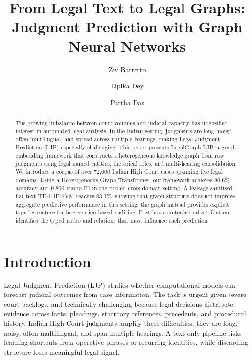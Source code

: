 \documentclass[runningheads]{llncs}
\newcommand{\method}{LegalGraph-LJP}
\begin{document}
\title{From Legal Text to Legal Graphs: Judgment Prediction with Graph Neural Networks}

\author{Ziv Barretto\and Lipika Dey\and Partha Das}


\maketitle

\begin{abstract}
The growing imbalance between court volumes and judicial capacity has intensified interest in automated legal analysis. In the Indian setting, judgments are long, noisy, often multilingual, and spread across multiple hearings, making Legal Judgment Prediction (LJP) especially challenging. This paper presents \method{}, a graph-embedding framework that constructs a heterogeneous knowledge graph from raw judgments using legal named entities, rhetorical roles, and multi-hearing consolidation. We introduce a corpus of over 72,000 Indian High Court cases spanning five legal domains. Using a Heterogeneous Graph Transformer, our framework achieves 80.6\% accuracy and 0.800 macro-F1 in the pooled cross-domain setting. A leakage-sanitised flat-text TF--IDF SVM reaches 83.1\%, showing that graph structure does not improve aggregate predictive performance in this setting; the graph instead provides explicit typed structure for intervention-based auditing. Post-hoc counterfactual attribution identifies the typed nodes and relations that most influence each prediction.
\end{abstract}

\section{Introduction}
\label{sec:introduction}

Legal Judgment Prediction (LJP) studies whether computational models can forecast judicial outcomes from case information. The task is urgent given severe court backlogs, and technically challenging because legal decisions distribute evidence across facts, pleadings, statutory references, precedents, and procedural history. Indian High Court judgments amplify these difficulties: they are long, noisy, often multilingual, and span multiple hearings. A text-only pipeline risks learning shortcuts from operative phrases or recurring identities, while discarding structure loses meaningful legal signal.
\end{document}
